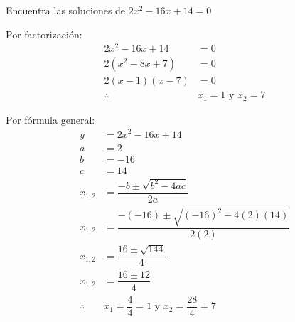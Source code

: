 Encuentra las soluciones de $2x^2-16x+14=0$

\begin{solutionbox}{12cm}
    \begin{multicols}{2}
        Por factorización:
        \begin{align*}
            2x^2-16x+14 & = 0                      \\
            2(x^2-8x+7) & = 0                      \\
            2(x-1)(x-7) & = 0                      \\
            \therefore  & x_1 =1 \text{ y } x_2 =7
        \end{align*}

        \columnbreak

        Por fórmula general:
        \begin{align*}
            y          & =	    2x^2-16x+14
            \\
            a          & =2
            \\
            b          & =-16
            \\
            c          & =14
            \\
            x_{1,2}    & = \dfrac{-b\pm\sqrt{b^2-4ac}}{2a}
            \\[2em]
            x_{1,2}    & = \dfrac{-(-16)\pm\sqrt{(-16)^2-4(2)(14)}}{2(2)}
            \\[2em]
            x_{1,2}    & = \dfrac{16\pm\sqrt{144}}{4}
            \\[2em]
            x_{1,2}    & = \dfrac{16\pm 12}{4}
            \\[2em]
            \therefore & x_1 =\dfrac{4}{4}=1 \text{ y }  x_2
            =\dfrac{28}{4}=7                                              \\[2em]
        \end{align*}
    \end{multicols}
\end{solutionbox}
